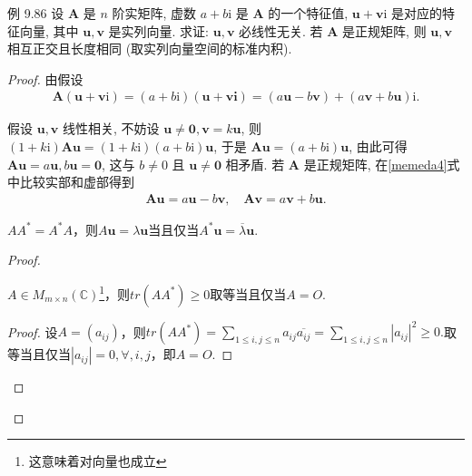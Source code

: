 \begin{theorem}[实与复的桥梁]\label{memeda8}
    例 9.86 设 $\boldsymbol{A}$ 是 $n$ 阶实矩阵, 虚数 $a+b \mathrm{i}$ 是 $\boldsymbol{A}$ 的一个特征值, $\boldsymbol{u}+\boldsymbol{v} \mathrm{i}$ 是对应的特征向量, 其中 $\boldsymbol{u}, \boldsymbol{v}$ 是实列向量. 求证: $\boldsymbol{u}, \boldsymbol{v}$ 必线性无关. 若 $\boldsymbol{A}$ 是正规矩阵, 则 $\boldsymbol{u}, \boldsymbol{v}$ 相互正交且长度相同 (取实列向量空间的标准内积).
\end{theorem}

\begin{proof}
    由假设
    \begin{align}\label{memeda4}
        \boldsymbol{A}(\boldsymbol{u}+\boldsymbol{v} \mathrm{i})=(a+b \mathrm{i})(\boldsymbol{u}+\boldsymbol{v i})=(a \boldsymbol{u}-b \boldsymbol{v})+(a \boldsymbol{v}+b \boldsymbol{u}) \mathrm{i} .
    \end{align}

    假设 $\boldsymbol{u}, \boldsymbol{v}$ 线性相关, 不妨设 $\boldsymbol{u} \neq \mathbf{0}, \boldsymbol{v}=k \boldsymbol{u}$, 则 $(1+k \mathrm{i}) \boldsymbol{A} \boldsymbol{u}=(1+k \mathrm{i})(a+b \mathrm{i}) \boldsymbol{u}$, 于是 $\boldsymbol{A} \boldsymbol{u}=(a+b \mathrm{i}) \boldsymbol{u}$, 由此可得 $\boldsymbol{A} \boldsymbol{u}=a \boldsymbol{u}, b \boldsymbol{u}=\mathbf{0}$, 这与 $b \neq 0$ 且 $\boldsymbol{u} \neq \mathbf{0}$ 相矛盾.
    若 $\boldsymbol{A}$ 是正规矩阵, 在\cref{memeda4}式中比较实部和虚部得到
    \begin{align*}
        \boldsymbol{A} \boldsymbol{u}=a \boldsymbol{u}-b \boldsymbol{v}, \quad \boldsymbol{A} \boldsymbol{v}=a \boldsymbol{v}+b \boldsymbol{u} .
    \end{align*}

    \begin{lemma}\label{memeda6}
        $AA^*=A^*A$，则$A\boldsymbol{u}=\lambda \boldsymbol{u}$当且仅当$A^*\boldsymbol{u}=\overline{\lambda} \boldsymbol{u}$.
    \end{lemma}

    \begin{proof}
        \begin{lemma}\label{memeda5}
            $A\in M_{m\times n}(\mathbb{C})$\footnote{这意味着对向量也成立}，则$tr(AA^*)\ge 0$取等当且仅当$A=O$.
        \end{lemma}

        \begin{proof}
            设$A=(a_{ij})$，则$tr(AA^*)=\sum_{1\le i,j\le n}a_{ij}\overline{a_{ij}}=\sum_{1\le i,j\le n}\left|a_{ij}\right|^2\ge 0.$取等当且仅当$\left|a_{ij}\right|=0,\forall ,i,j$，即$A=O$.
        \end{proof}


\end{proof}
\end{proof}
